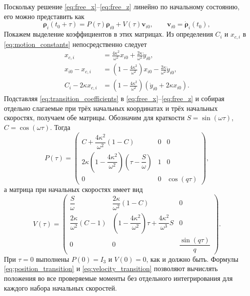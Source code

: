 \documentclass[a4paper,12pt]{article}
\begin{document}
Поскольку решение \eqref{eq:free_x}--\eqref{eq:free_z} линейно по начальному состоянию, его можно представить как
\begin{equation}
    \boldsymbol\rho_i(t_0+\tau)
    =P(\tau)\boldsymbol\rho_{i0}+V(\tau)\mathbf v_{i0},
    \qquad
    \mathbf v_{i0}=\dot{\boldsymbol\rho}_i(t_0),
    \label{eq:state_transition}
\end{equation}
Покажем выделение коэффициентов в этих матрицах.
Из определения $C_i$ и $x_{c,i}$ в
\eqref{eq:motion_constants} непосредственно следует
\begin{equation}
\begin{aligned}
 x_{c,i}
   &=\frac{4\kappa^2}{\omega^2}x_{i0}
      +\frac{2\kappa}{\omega^2}\dot y_{i0},\\
 x_{i0}-x_{c,i}
   &=\left(1-\frac{4\kappa^2}{\omega^2}\right)x_{i0}
       -\frac{2\kappa}{\omega^2}\dot y_{i0},\\
 C_i-2\kappa x_{c,i}
   &=\left(1-\frac{4\kappa^2}{\omega^2}\right)
                        (\dot y_{i0}+2\kappa x_{i0}).
\end{aligned}
\label{eq:transition_coefficients}
\end{equation}
Подставляя \eqref{eq:transition_coefficients} в
\eqref{eq:free_x}--\eqref{eq:free_z} и собирая отдельно слагаемые
при трёх начальных координатах и трёх начальных скоростях,
получаем обе матрицы. Обозначим для краткости
$S=\sin(\omega\tau)$, $C=\cos(\omega\tau)$. Тогда
\begin{equation}
    P(\tau)=
    \begin{pmatrix}
    C+\dfrac{4\kappa^2}{\omega^2}(1-C)&0&0\\[0.7em]
    2\kappa\left(1-\dfrac{4\kappa^2}{\omega^2}\right)
             \left(\tau-\dfrac{S}{\omega}\right)&1&0\\[0.7em]
    0&0&\cos(q\tau)
    \end{pmatrix},
    \label{eq:position_transition}
\end{equation}
а матрица при начальных скоростях имеет вид
\begin{equation}
    V(\tau)=
    \begin{pmatrix}
    \dfrac{S}{\omega}
       &\dfrac{2\kappa}{\omega^2}(1-C)&0\\[0.7em]
    \dfrac{2\kappa}{\omega^2}(C-1)
       &\left(1-\dfrac{4\kappa^2}{\omega^2}\right)\tau
          +\dfrac{4\kappa^2}{\omega^3}S&0\\[0.7em]
    0&0&\dfrac{\sin(q\tau)}{q}
    \end{pmatrix}.
    \label{eq:velocity_transition}
\end{equation}
При $\tau=0$ выполнены $P(0)=I_3$ и $V(0)=0$, как и должно быть. Формулы \eqref{eq:position_transition} и \eqref{eq:velocity_transition} позволяют вычислять положения во все проверяемые моменты без отдельного интегрирования для каждого набора начальных скоростей.
\end{document}
